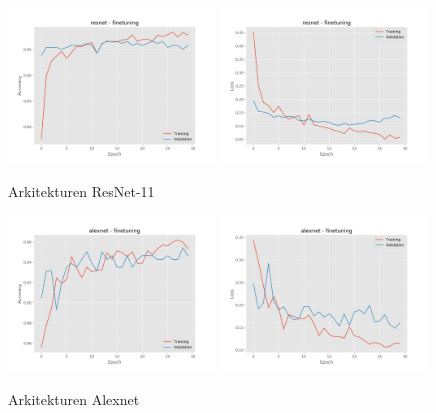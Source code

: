 \documentclass{kththesis}
\begin{document}
    \begin{figure}
      \centering
      \includegraphics[width=0.49\textwidth]{"./balcony/balcony-20split - acc - resnet - finetuning"}
      \includegraphics[width=0.49\textwidth]{"./balcony/balcony-20split - loss - resnet - finetuning"}
      \caption{Arkitekturen ResNet-11}
    \end{figure}

    \begin{figure}
      \centering
      \includegraphics[width=0.49\textwidth]{"./balcony/balcony-20split - acc - alexnet - finetuning"}
      \includegraphics[width=0.49\textwidth]{"./balcony/balcony-20split - loss - alexnet - finetuning"}
      \caption{Arkitekturen Alexnet}
    \end{figure}
\end{document}
